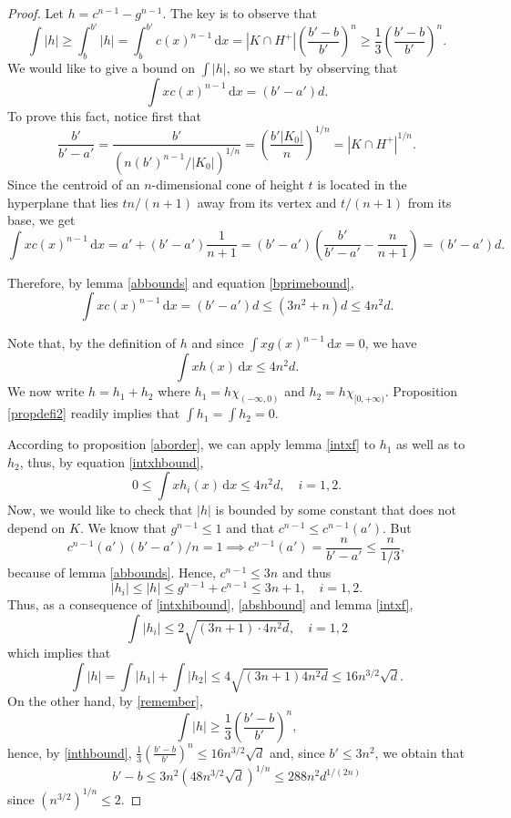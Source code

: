 \documentclass[12pt,reqno]{amsart}
\theoremstyle{plain}
\theoremstyle{definition}
\theoremstyle{remark}
\numberwithin{equation}{section}
\newcommand{\dx}[0]{\,\mathrm{d}x}
\begin{document}
\begin{proof} 
Let $h=c^{n-1}-g^{n-1}$. The key is to observe that
\begin{equation}\label{remember}
    \int |h|\geq \int_b^{b'}|h|=\int_{b}^{b'}c(x)^{n-1}\dx=|K\cap H^+|\left(\frac{b'-b}{b'}\right)^n\geq \frac 13\left(\frac{b'-b}{b'}\right)^n.
\end{equation}
We would like to give a bound on $\int |h|$, so we start by observing that
$$\int xc(x)^{n-1}\dx=(b'-a')d.$$
To prove this fact, notice first that $$
\frac{b'}{b'-a'}=\frac{b'}{(n(b')^{n-1}/|K_0|)^{1/n}}=\left(\frac{b'|K_0|}{n}\right)^{1/n}=|K\cap H^+|^{1/n}.$$ Since the centroid of an $n$-dimensional cone of height $t$ is located in the hyperplane that lies $t n/(n+1)$ away from its vertex and $t/(n+1)$ from its base, we get
$$\int xc(x)^{n-1}\dx=a'+(b'-a')\frac{1}{n+1}=(b'-a')\left(\frac{b'}{b'-a'}-\frac{n}{n+1}\right)=(b'-a')d.$$


Therefore, by lemma \ref{abbounds} and equation \eqref{bprimebound}, $$\int xc(x)^{n-1}\dx= (b'-a')d\leq (3n^2+n)d\leq 4n^2d.$$


Note that, by the definition of $h$ and since $\int xg(x)^{n-1}\dx=0$, we have
\begin{equation}\label{intxhbound}
    \int xh(x)\dx\leq 4n^2d.
\end{equation}
We now write $h=h_1+h_2$ where $h_1=h\chi_{(-\infty,0)}$ and $h_2=h\chi_{[0,+\infty)}$. Proposition \ref{propdefi2} readily implies that $\int h_1=\int h_2=0$.

According to proposition \ref{aborder}, we can apply lemma \ref{intxf} to $h_1$ as well as to $h_2$, thus, by equation \eqref{intxhbound},
\begin{equation}\label{intxhibound}
    0\leq \int xh_i(x)\dx\leq 4n^2d,\quad i=1,2.
\end{equation}
Now, we would like to check that $|h|$ is bounded by some constant that does not depend on $K$. We know that $g^{n-1}\leq 1$ and that $c^{n-1}\leq c^{n-1}(a')$. But $$c^{n-1}(a')(b'-a')/n=1\implies c^{n-1}(a')=\frac{n}{b'-a'}\leq \frac{n}{1/3},$$ because of lemma \ref{abbounds}. Hence, $c^{n-1}\leq 3n$ and thus
\begin{equation}\label{abshbound}
    |h_i|\leq |h|\leq g^{n-1}+c^{n-1}\leq 3n+1,\quad i=1,2.
\end{equation}
Thus, as a consequence of \eqref{intxhibound}, \eqref{abshbound} and lemma \ref{intxf},
$$\int |h_i|\leq 2\sqrt{(3n+1)\cdot 4n^2d},\quad i=1,2$$
which implies that
\begin{equation}\label{inthbound}
    \int |h| = \int |h_1|+\int |h_2|\leq 4\sqrt{(3n+1)4n^2d}\leq 16n^{3/2}\sqrt{d}.
\end{equation}
On the other hand, by \eqref{remember},
$$\int |h|\geq \frac 13\left(\frac{b'-b}{b'}\right)^n,$$
hence, by \eqref{inthbound}, $\frac 13\left(\frac{b'-b}{b'}\right)^n\leq 16n^{3/2}\sqrt{d}$ and, since $b'\leq 3n^2$, we obtain that
$$b'-b\leq 3n^2(48n^{3/2}\sqrt{d})^{1/n}\leq 288n^2 d^{1/(2n)}$$
since $(n^{3/2})^{1/n}\leq 2$.\end{proof}
\end{document}
